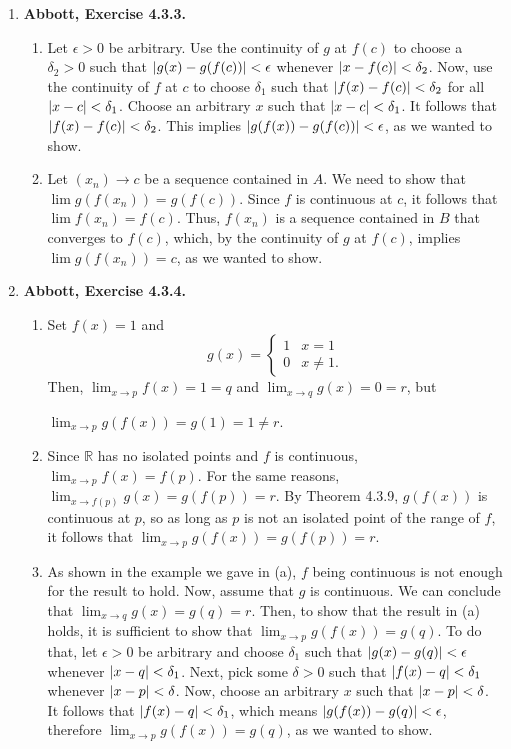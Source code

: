 \documentclass{article}
\DeclarePairedDelimiter\abs{\lvert}{\rvert}
\newcommand{\R}{\mathbb{R}}
\newcommand{\exc}[2][Abbott]{\item \textbf{#1, Exercise #2.}}
\newcommand{\lep}[1][L]{#1et $\epsilon > 0$ be arbitrary}
\begin{document}
\begin{enumerate}
\begin{enumerate}
    \end{enumerate}
    
    \exc{4.3.3}
    \begin{enumerate}
        \item \lep. Use the continuity of $g$ at $f(c)$ to choose a $\delta_2 > 0$ such that $\abs{g(x)-g(f(c))} < \epsilon$ whenever $\abs{x-f(c)} < \delta_2$. Now, use the continuity of $f$ at $c$ to choose $\delta_1$ such that $\abs{f(x)-f(c)} < \delta_2$ for all $\abs{x-c} < \delta_1$. Choose an arbitrary $x$ such that $\abs{x-c} < \delta_1$. It follows that $\abs{f(x)-f(c)} < \delta_2$. This implies $\abs{g(f(x))-g(f(c))} < \epsilon$, as we wanted to show.
        
        \item Let $(x_n) \to c$ be a sequence contained in $A$. We need to show that $\lim g(f(x_n)) = g(f(c))$. Since $f$ is continuous at $c$, it follows that $\lim f(x_n) = f(c)$. Thus, $f(x_n)$ is a sequence contained in $B$ that converges to $f(c)$, which, by the continuity of $g$ at $f(c)$, implies $\lim g(f(x_n)) = c$, as we wanted to show.
    \end{enumerate}
    
    \exc{4.3.4}
    \begin{enumerate}
        \item Set $f(x) = 1$ and 
        \begin{equation*}
            g(x) = \begin{cases}
            1 & x = 1 \\
            0 & x \neq 1.
            \end{cases}
        \end{equation*} Then, $\lim_{x \to p} f(x) = 1 = q$ and $\lim_{x \to q} g(x) = 0 = r$, but 
        
        \noindent $\lim_{x \to p} g(f(x)) = g(1) = 1 \neq r$.
        
        \item Since $\R$ has no isolated points and $f$ is continuous, $\lim_{x \to p} f(x) = f(p)$. For the same reasons, $\lim_{x \to f(p)} g(x) = g(f(p)) = r$. By Theorem 4.3.9, $g(f(x))$ is continuous at $p$, so as long as $p$ is not an isolated point of the range of $f$, it follows that $\lim_{x \to p} g(f(x)) = g(f(p)) = r$. 
        
        \item As shown in the example we gave in (a), $f$ being continuous is not enough for the result to hold. Now, assume that $g$ is continuous. We can conclude that $\lim_{x \to q} g(x) = g(q) = r$. Then, to show that the result in (a) holds, it is sufficient to show that $\lim_{x \to p} g(f(x)) = g(q)$. To do that, \lep[l] \space and choose $\delta_1$ such that $\abs{g(x)-g(q)} < \epsilon$ whenever $\abs{x-q} < \delta_1$. Next, pick some $\delta > 0$ such that $\abs{f(x)-q} < \delta_1$ whenever $\abs{x-p} < \delta$. Now, choose an arbitrary $x$ such that $\abs{x-p} < \delta$. It follows that $\abs{f(x)-q} < \delta_1$, which means $\abs{g(f(x))-g(q)} < \epsilon$, therefore $\lim_{x \to p} g(f(x)) = g(q)$, as we wanted to show.
    \end{enumerate}
    

\end{enumerate}
\end{document}

